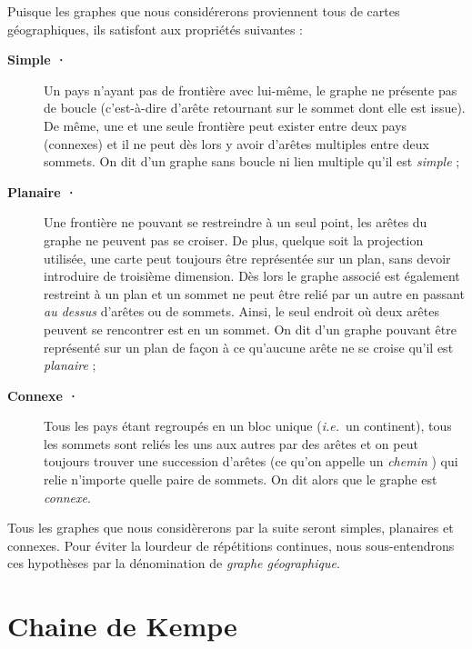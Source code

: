 Puisque les graphes que nous considérerons proviennent tous de cartes géographiques, ils satisfont aux propriétés suivantes :
\begin{description}

\item[\textbf{Simple ·}] Un pays n'ayant pas de frontière avec lui-même, le graphe ne présente pas de boucle (c'est-à-dire d'arête retournant sur le sommet dont elle est issue). De même, une et une seule frontière peut exister entre deux pays (connexes) et il ne peut dès lors y avoir d'arêtes multiples entre deux sommets. On dit d'un graphe sans boucle ni lien multiple qu'il est \textit{simple} ;
\item[\textbf{Planaire ·}] Une frontière ne pouvant se restreindre à un seul point, les arêtes du graphe ne peuvent pas se croiser. De plus, quelque soit la projection utilisée, une carte peut toujours être représentée sur un plan, sans devoir introduire de troisième dimension. Dès lors le graphe associé est également restreint à un plan et un sommet ne peut être relié par un autre en passant \textit{au dessus} d'arêtes ou de sommets. Ainsi, le seul endroit où deux arêtes peuvent se rencontrer est en un sommet. On dit d'un graphe pouvant être représenté sur un plan de façon à ce qu'aucune arête ne se croise qu'il est \textit{planaire} ;
\item[\textbf{Connexe ·}] Tous les pays étant regroupés en un bloc unique (\textit{i.e.}~un continent), tous les sommets sont reliés les uns aux autres par des arêtes et on peut toujours trouver une succession d'arêtes (ce qu'on appelle un \textit{chemin}%
) qui relie n'importe quelle paire de sommets. On dit alors que le graphe est \textit{connexe}.
\end{description}
Tous les graphes que nous considèrerons par la suite seront simples, planaires et connexes. Pour éviter la lourdeur de répétitions continues, nous sous-entendrons ces hypothèses par la dénomination de \textit{graphe géographique}.

\section{Chaine de Kempe}

